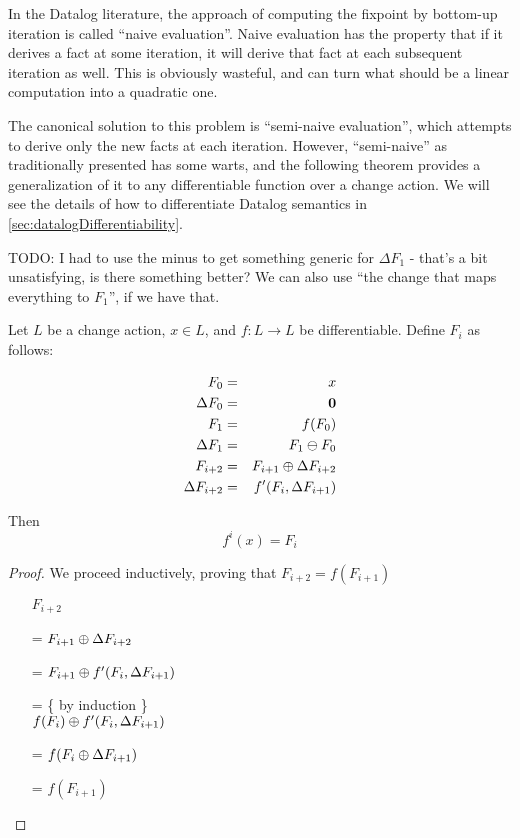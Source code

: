 In the Datalog literature, the approach of computing the fixpoint by bottom-up
iteration is called ``naive evaluation''. Naive evaluation has the property that
if it derives a fact at some iteration, it will derive that fact at each
subsequent iteration as well. This is obviously wasteful, and can turn what
should be a linear computation into a quadratic one.

The canonical solution to this problem is ``semi-naive evaluation'', which
attempts to derive only the new facts at each iteration. However, ``semi-naive''
as traditionally presented has some warts, and
the following theorem provides a generalization of it to any differentiable function over a
change action. We will see the details of how to differentiate Datalog
semantics in \cref{sec:datalogDifferentiability}.

TODO: I had to use the minus to get something generic for $\Delta F_1$ - that's
a bit unsatisfying, is there something better? We can also use ``the change that
maps everything to $F_1$'', if we have that.

\begin{thm}
\label{thm:diffIter}
  Let $L$ be a change action, $x \in L$, and $f: L \rightarrow L$ be differentiable. Define $F_i$ as follows:

  \begin{eqnarray*}
  F_0 & = & x\\
  \Delta F_0 & = & \textbf{0} \\
  F_1 & = & f(F_0)\\
  \Delta F_1 & = & F_1 \ominus F_0 \\
  F_{i+2} & = & F_{i+1} \oplus \Delta F_{i+2} \\
  \Delta F_{i+2} & = & f'(F_i, \Delta F_{i+1}) \\
  \end{eqnarray*}

  Then 
  $$f^i(x) = F_i$$
\end{thm}

\ifproofs
\begin{proof}
We proceed inductively, proving that $F_{i+2} = f(F_{i+1})$

\begin{itemize}
\item[ ]$F_{i+2}$
\item[=]
$
F_{i+1} \oplus \Delta F_{i+2}
$
\item[=]
$
F_{i+1} \oplus f'( F_i, \Delta F_{i+1})
$
\item[=] \{ by induction \}\\
$
f(F_i) \oplus f'(F_i, \Delta F_{i+1})
$
\item[=]
$
f(F_i \oplus \Delta F_{i+1})
$ 
\item[=]
$f(F_{i+1})$
\end{itemize}
\end{proof}
\fi


